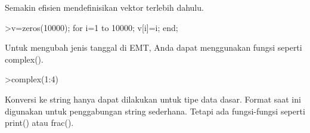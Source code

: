 \documentclass[a4paper,10pt]{article}
\begin{document}
\begin{eulernotebook}
\begin{eulercomment}
\begin{eulercomment}
\begin{eulercomment}
\begin{eulercomment}
\begin{eulercomment}
\begin{eulercomment}
\begin{eulercomment}
\begin{eulercomment}
\begin{eulercomment}
\begin{eulercomment}
\begin{eulercomment}
\begin{eulercomment}
\begin{eulercomment}
\begin{eulercomment}
\begin{eulercomment}
\begin{eulercomment}
\begin{eulercomment}
\begin{eulercomment}
\begin{eulercomment}
\begin{eulercomment}
\begin{eulercomment}
\begin{eulercomment}
\begin{eulercomment}
Semakin efisien mendefinisikan vektor terlebih dahulu.
\end{eulercomment}
\begin{eulerprompt}
>v=zeros(10000); for i=1 to 10000; v[i]=i; end;
\end{eulerprompt}
\begin{eulercomment}
Untuk mengubah jenis tanggal di EMT, Anda dapat menggunakan fungsi
seperti complex().
\end{eulercomment}
\begin{eulerprompt}
>complex(1:4)
\end{eulerprompt}
\begin{euleroutput}
  [ 1+0i ,  2+0i ,  3+0i ,  4+0i  ]
\end{euleroutput}
\begin{eulercomment}
Konversi ke string hanya dapat dilakukan untuk tipe data dasar. Format
saat ini digunakan untuk penggabungan string sederhana. Tetapi ada
fungsi-fungsi seperti print() atau frac().


\end{eulercomment}
\end{eulercomment}
\end{eulercomment}
\end{eulercomment}
\end{eulercomment}
\end{eulercomment}
\end{eulercomment}
\end{eulercomment}
\end{eulercomment}
\end{eulercomment}
\end{eulercomment}
\end{eulercomment}
\end{eulercomment}
\end{eulercomment}
\end{eulercomment}
\end{eulercomment}
\end{eulercomment}
\end{eulercomment}
\end{eulercomment}
\end{eulercomment}
\end{eulercomment}
\end{eulercomment}
\end{eulercomment}
\end{eulernotebook}
\end{document}
